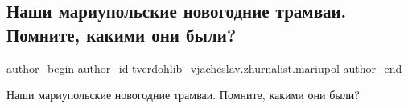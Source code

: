  
 
 
 
 

\subsection{Наши мариупольские новогодние трамваи. Помните, какими они были?}
\label{sec:18_12_2022.fb.tverdohlib_vjacheslav.zhurnalist.mariupol.1.nashi_mariupolskie_n}

\ifcmt
 author_begin
   author_id tverdohlib_vjacheslav.zhurnalist.mariupol
 author_end
\fi

Наши мариупольские новогодние трамваи. Помните, какими они были?

